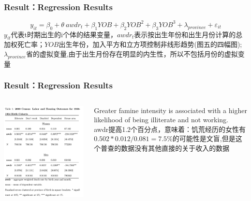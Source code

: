 \documentclass{beamer}
\begin{document}
\begin{frame}
	\frametitle{Result：Regression Results}
	$$y_{it}=\beta_0+\theta~awdr_t+\beta_1YOB+\beta_2YOB^2+\beta_3YOB^3+\lambda_{province}+\varepsilon_{it}$$
	$y_{it}$代表t时期出生的i个体的结果变量，$awdr_t$表示按出生年份和出生月份计算的总加权死亡率；$YOB$出生年份，加入平方和立方项控制非线形趋势(图五的四幅图);$\lambda_{province}$省的虚拟变量,由于出生月份存在明显的内生性，所以不包括月份的虚拟变量
\end{frame}


\begin{frame}
\frametitle{Result：Regression Results}
	\begin{columns}
            \begin{minipage}[c][0.4\textheight][c]{\linewidth}
                \centering
                \includegraphics[width=0.9\linewidth]{table1}
            \end{minipage}
           
           	\begin{minipage}[c][0.4\textheight][c]{\linewidth}
            Greater famine intensity is associated with a higher likelihood of being illiterate and not working.\\awdr提高1.2个百分点，意味着：饥荒经历的女性有$0.502*0.012/0.081=7.5\%$的可能性是文盲,但是这个普查的数据没有其他直接的关于收入的数据
            \end{minipage}
    \end{columns}
\end{frame}
\end{document}
